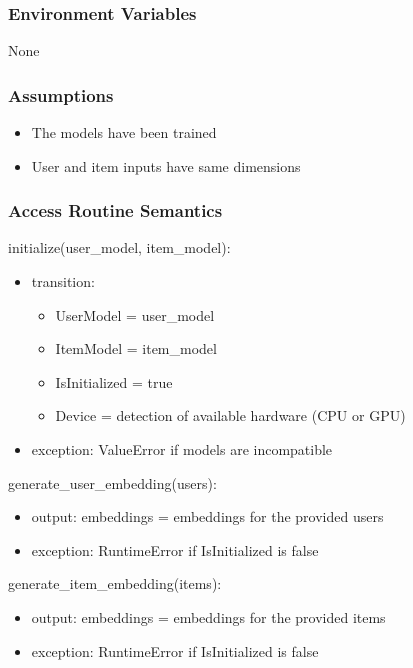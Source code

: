 \documentclass[12pt, titlepage]{article}
\begin{document}
\subsubsection{Environment Variables}

None

\subsubsection{Assumptions}

\begin{itemize}
  \item The models have been trained
  \item User and item inputs have same dimensions
\end{itemize}

\subsubsection{Access Routine Semantics}

\noindent initialize(user\_model, item\_model):
\begin{itemize}
\item transition:
  \begin{itemize}
    \item UserModel = user\_model
    \item ItemModel = item\_model
    \item IsInitialized = true
    \item Device = detection of available hardware (CPU or GPU)
  \end{itemize}
\item exception: ValueError if models are incompatible
\end{itemize}

\noindent generate\_user\_embedding(users):
\begin{itemize}
\item output: embeddings = embeddings for the provided users
\item exception: RuntimeError if IsInitialized is false
\end{itemize}


\noindent generate\_item\_embedding(items):
\begin{itemize}
\item output: embeddings = embeddings for the provided items
\item exception: RuntimeError if IsInitialized is false
\end{itemize}
\end{document}
